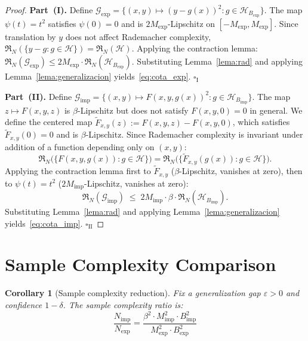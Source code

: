 \documentclass[12pt]{article}
\newtheorem{corollary}[theorem]{Corollary}
\newcommand{\Rad}{\mathfrak{R}}
\begin{document}
\begin{proof}
\textbf{Part~(I).}
Define
$\mathcal{G}_{\mathrm{exp}} = \{(x,y) \mapsto (y - g(x))^2
: g \in \mathcal{H}_{B_{\mathrm{exp}}}\}$.
The map $\psi(t) = t^2$ satisfies $\psi(0) = 0$ and is
$2M_{\mathrm{exp}}$-Lipschitz on
$[-M_{\mathrm{exp}}, M_{\mathrm{exp}}]$.
Since translation by $y$ does not affect Rademacher complexity,
$\Rad_N(\{y - g : g \in \mathcal{H}\}) = \Rad_N(\mathcal{H})$.
Applying the contraction lemma:
$\Rad_N(\mathcal{G}_{\mathrm{exp}})
\le 2M_{\mathrm{exp}} \cdot \Rad_N(\mathcal{H}_{B_{\mathrm{exp}}})$.
Substituting Lemma~\ref{lema:rad} and applying
Lemma~\ref{lema:generalizacion} yields~\eqref{eq:cota_exp}.
\hfill $\square_{\mathrm{I}}$

\medskip

\textbf{Part~(II).}
Define
$\mathcal{G}_{\mathrm{imp}} = \{(x,y) \mapsto F(x,y,g(x))^2
: g \in \mathcal{H}_{B_{\mathrm{imp}}}\}$.
The map $z \mapsto F(x,y,z)$ is $\beta$-Lipschitz but does not
satisfy $F(x,y,0) = 0$ in general.
We define the centered map
$\tilde{F}_{x,y}(z) := F(x,y,z) - F(x,y,0)$, which satisfies
$\tilde{F}_{x,y}(0) = 0$ and is $\beta$-Lipschitz.
Since Rademacher complexity is invariant under addition of a function
depending only on $(x,y)$:
\begin{equation}
  \Rad_N\bigl(\{F(x,y,g(x)) : g \in \mathcal{H}\}\bigr)
  = \Rad_N\bigl(\{\tilde{F}_{x,y}(g(x)) : g \in \mathcal{H}\}\bigr).
\end{equation}
Applying the contraction lemma first to $\tilde{F}_{x,y}$
($\beta$-Lipschitz, vanishes at zero), then to
$\psi(t) = t^2$ ($2M_{\mathrm{imp}}$-Lipschitz, vanishes at zero):
\begin{equation}
  \Rad_N(\mathcal{G}_{\mathrm{imp}})
  \;\le\; 2M_{\mathrm{imp}} \cdot \beta \cdot
  \Rad_N(\mathcal{H}_{B_{\mathrm{imp}}}).
\end{equation}
Substituting Lemma~\ref{lema:rad} and applying
Lemma~\ref{lema:generalizacion} yields~\eqref{eq:cota_imp}.
\hfill $\square_{\mathrm{II}}$
\end{proof}

\section{Sample Complexity Comparison}
\label{sec:sample}

\begin{corollary}[Sample complexity reduction]
\label{cor:datos}
Fix a generalization gap $\varepsilon > 0$ and confidence
$1 - \delta$.
The sample complexity ratio is:
\begin{equation}
  \boxed{
    \frac{N_{\mathrm{imp}}}{N_{\mathrm{exp}}}
    = \frac{\beta^2 \cdot M_{\mathrm{imp}}^2 \cdot
      B_{\mathrm{imp}}^2}
    {M_{\mathrm{exp}}^2 \cdot B_{\mathrm{exp}}^2}
  }
  \label{eq:ratio}
\end{equation}
\end{corollary}
\end{document}
